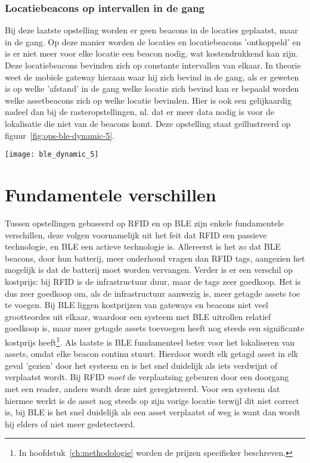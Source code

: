 \subsubsection{Locatiebeacons op intervallen in de gang}
\begin{minipage}{0.65\textwidth}
Bij deze laatste opstelling worden er geen beacons in de locaties geplaatst, maar in de gang. Op deze manier worden de locaties en locatiebeacons 'ontkoppeld' en is er niet meer voor elke locatie een beacon nodig, wat kostendrukkend kan zijn. Deze locatiebeacons bevinden zich op constante intervallen van elkaar. In theorie weet de mobiele gateway hieraan waar hij zich bevind in de gang, als er geweten is op welke 'afstand' in de gang welke locatie zich bevind kan er bepaald worden welke assetbeacons zich op welke locatie bevinden. Hier is ook een gelijkaardig nadeel dan bij de rasteropstellingen, nl. dat er meer data nodig is voor de lokalisatie die niet van de beacons komt. Deze opstelling staat geïllustreerd op figuur~\ref{fig:ops-ble-dynamic-5}.
\end{minipage}
\hfill
\begin{minipage}{0.30\textwidth}
	\texttt{[image: ble\_dynamic\_5]}
	\label{fig:ops-ble-dynamic-5}
\end{minipage}

\section{Fundamentele verschillen}
Tussen opstellingen gebaseerd op RFID en op BLE zijn enkele fundamentele verschillen, deze volgen voornamelijk uit het feit dat RFID een passieve technologie, en BLE een actieve technologie is. Allereerst is het zo dat BLE beacons, door hun batterij, meer onderhoud vragen dan RFID tags, aangezien het mogelijk is dat de batterij moet worden vervangen. Verder is er een verschil op kostprijs: bij RFID is de infrastructuur duur, maar de tags zeer goedkoop. Het is dus zeer goedkoop om, als de infrastructuur aanwezig is, meer getagde assets toe te voegen. Bij BLE liggen kostprijzen van gateways en beacons niet veel grootteordes uit elkaar, waardoor een systeem met BLE uitrollen relatief goedkoop is, maar meer getagde assets toevoegen heeft nog steeds een significante kostprijs heeft\footnote{In hoofdstuk~\ref{ch:methodologie} worden de prijzen specifieker beschreven.}. Als laatste is BLE fundamenteel beter voor het lokaliseren van assets, omdat elke beacon continu stuurt. Hierdoor wordt elk getagd asset in elk geval 'gezien' door het systeem en is het snel duidelijk als iets verdwijnt of verplaatst wordt. Bij RFID \emph{moet} de verplaatsing gebeuren door een doorgang met een reader, anders wordt deze niet geregistreerd. Voor een systeem dat hiermee werkt is de asset nog steeds op zijn vorige locatie terwijl dit niet correct is, bij BLE is het snel duidelijk als een asset verplaatst of weg is want dan wordt hij elders of niet meer gedetecteerd.


